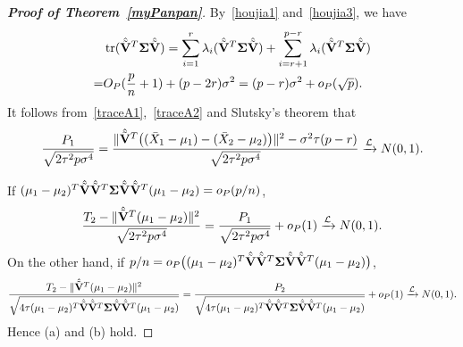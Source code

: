 \documentclass[3p]{elsarticle}
\DeclareMathOperator{\mytr}{tr}
\theoremstyle{plain}
\theoremstyle{definition}
\theoremstyle{remark}
\begin{document}
\begin{appendices}
\begin{proof}[\textbf{Proof of Theorem~\ref{myPanpan}}]
By~\eqref{houjia1} and~\eqref{houjia3}, we have
\begin{equation}\label{traceA2}
    \begin{aligned}
        &\mytr(\hat{\tilde{\BV}}^T\bSigma\hat{\tilde{\BV}})=
    \sum_{i=1}^r \lambda_i(\hat{\tilde{\BV}}^T\bSigma\hat{\tilde{\BV}})
    +
    \sum_{i=r+1}^{p-r} \lambda_i(\hat{\tilde{\BV}}^T\bSigma\hat{\tilde{\BV}})\\
        =&
    O_P(\frac{p}{n}+1)+(p-2r)\sigma^2
        =
        (p-r)\sigma^2+o_P(\sqrt{p}).
    \end{aligned}
\end{equation}
It follows from~\eqref{traceA1},~\eqref{traceA2} and Slutsky's theorem that
$$
\frac{P_1}{\sqrt{2\tau^2 p\sigma^4}}=
\frac{\|\hat{\tilde{\mathbf{V}}}^T\big((\bar{X}_1-\mu_1)-(\bar{X}_2-\mu_2)\big)\|^2-\sigma^2\tau(p-r) }{\sqrt{2\tau^2 p\sigma^4}}\xrightarrow{\mathcal{L}}N(0,1).
$$

If $(\mu_1-\mu_2)^T \hat{\tilde{\mathbf{V}}}\hat{\tilde{\mathbf{V}}}^T \boldsymbol{\Sigma}\hat{\tilde{\mathbf{V}}}\hat{\tilde{\mathbf{V}}}^T (\mu_1-\mu_2)=o_P(p/n)$,
$$
\frac{T_2-\|\hat{\tilde{\mathbf{V}}}^T (\mu_1-\mu_2)\|^2}{\sqrt{2\tau^2 p \sigma^4}}
=
\frac{P_1}{\sqrt{2\tau^2 p \sigma^4}}+o_P(1)\xrightarrow{\mathcal{L}}N(0,1).
$$
On the other hand, if $p/n=o_P\big((\mu_1-\mu_2)^T \hat{\tilde{\mathbf{V}}}\hat{\tilde{\mathbf{V}}}^T \boldsymbol{\Sigma}\hat{\tilde{\mathbf{V}}}\hat{\tilde{\mathbf{V}}}^T (\mu_1-\mu_2)\big)$,
$$
\frac{T_2-\|\hat{\tilde{\mathbf{V}}}^T (\mu_1-\mu_2)\|^2}{\sqrt{4\tau (\mu_1-\mu_2)^T \hat{\tilde{\mathbf{V}}}\hat{\tilde{\mathbf{V}}}^T \boldsymbol{\Sigma}\hat{\tilde{\mathbf{V}}}\hat{\tilde{\mathbf{V}}}^T (\mu_1-\mu_2)}}
=
\frac{P_2}{\sqrt{4\tau (\mu_1-\mu_2)^T \hat{\tilde{\mathbf{V}}}\hat{\tilde{\mathbf{V}}}^T \boldsymbol{\Sigma}\hat{\tilde{\mathbf{V}}}\hat{\tilde{\mathbf{V}}}^T (\mu_1-\mu_2)}}+o_P(1)\xrightarrow{\mathcal{L}}N(0,1).
$$
Hence (a) and (b) hold.


\end{proof}
\end{appendices}
\end{document}
